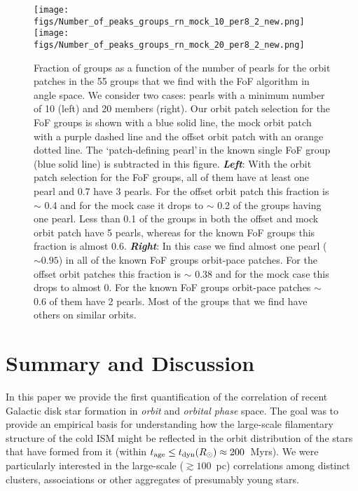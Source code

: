 \documentclass[twocolumn]{aastex631}
\begin{document}
\begin{figure*}
\centering
\hspace*{-0.2cm}\texttt{[image: figs/Number\_of\_peaks\_groups\_rn\_mock\_10\_per8\_2\_new.png]}\hspace*{-0.2cm}
\hspace*{-0.2cm}\texttt{[image: figs/Number\_of\_peaks\_groups\_rn\_mock\_20\_per8\_2\_new.png]}\hspace*{-0.2cm}\\
\caption{Fraction of groups as a function of the number of pearls for the orbit patches in the 55 groups that we find with the FoF algorithm in angle space. We consider two cases: pearls with a minimum number of 10 (left) and 20 members (right). Our orbit patch selection for the FoF groups is shown with a blue solid line, the mock orbit patch with a purple dashed line and the offset orbit patch with an orange dotted line. The \textquoteleft patch-defining pearl\textquoteright\,in the known single FoF group (blue solid line) is subtracted in this figure. 
\newline
\textit{\textbf{Left}}: With the orbit patch selection for the FoF groups, all of them have at least one pearl and 0.7 have 3 pearls. For the offset orbit patch this fraction is $\sim$ 0.4 and for the mock case it drops to $\sim$ 0.2 of the groups having one pearl. Less than 0.1 of the groups in both the offset and mock orbit patch have 5 pearls, whereas for the known FoF groups this fraction is almost 0.6. 
\newline
\textit{\textbf{Right}}: In this case we find almost one pearl ($\sim 0.95$) in all of the known FoF groups orbit-pace patches. For the offset orbit patches this fraction is $\sim$ 0.38 and for the mock case this drops to almost 0. For the known FoF groups orbit-pace patches $\sim$ 0.6 of them have 2 pearls. Most of the groups that we find have others on similar orbits. } 
\label{fig:n_pearls}
\end{figure*}


\section{Summary and Discussion}
\label{sec:summary}

In this paper we provide the first quantification of the correlation of recent Galactic disk star formation in \emph{orbit} and \emph{orbital phase} space.  The goal was to provide an empirical basis for understanding how the large-scale filamentary structure of the cold ISM \citep{Alves2020} might  be reflected in the orbit distribution of the stars that have formed from it (within $t_{\rm age}\le t_{\rm dyn}(R_\odot )\approx 200$~Myrs). We were particularly interested in the large-scale ($\gtrsim 100$~pc) correlations among distinct clusters, associations or other aggregates of presumably young stars.  
\end{document}
